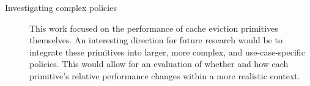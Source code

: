 \begin{description}
    \item[Investigating complex policies]
    This work focused on the performance of cache eviction primitives themselves. An interesting direction for future research would be to integrate these primitives into larger, more complex, and use-case-specific policies. This would allow for an evaluation of whether and how each primitive's relative performance changes within a more realistic context.
    
\end{description}










